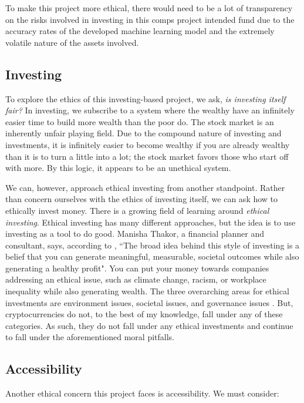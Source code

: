 \documentclass[10pt,twocolumn]{article}
\begin{document}
To make this project more ethical, there would need to be a lot of transparency on the risks involved in investing in this comps project intended fund due to the accuracy rates of the developed machine learning model and the extremely volatile nature of the assets involved.

\subsection{Investing}

To explore the ethics of this investing-based project, we ask, \textit{is investing itself fair?} In investing, we subscribe to a system where the wealthy have an infinitely easier time to build more wealth than the poor do. The stock market is an inherently unfair playing field. Due to the compound nature of investing and investments, it is infinitely easier to become wealthy if you are already wealthy than it is to turn a little into a lot; the stock market favors those who start off with more. By this logic, it appears to be an unethical system.

We can, however, approach ethical investing from another standpoint. Rather than concern ourselves with the ethics of investing itself, we can ask how to ethically invest money. There is a growing field of learning around \textit{ethical investing}. Ethical investing has many different approaches, but the idea is to use investing as a tool to do good. Manisha Thakor, a financial planner and consultant, says, according to , ``The broad idea behind this style of investing is a belief that you can generate meaningful, measurable, societal outcomes while also generating a healthy profit". You can put your money towards companies addressing an ethical issue, such as climate change, racism, or workplace inequality while also generating wealth. The three overarching areas for ethical investments are environment issues, societal issues, and governance issues \cite{LimitsOfEthicalInvesting}. But, cryptocurrencies do not, to the best of my knowledge, fall under any of these categories. As such, they do not fall under any ethical investments and continue to fall under the aforementioned moral pitfalls.


\subsection{Accessibility}

Another ethical concern this project faces is accessibility. We must consider:
\end{document}
